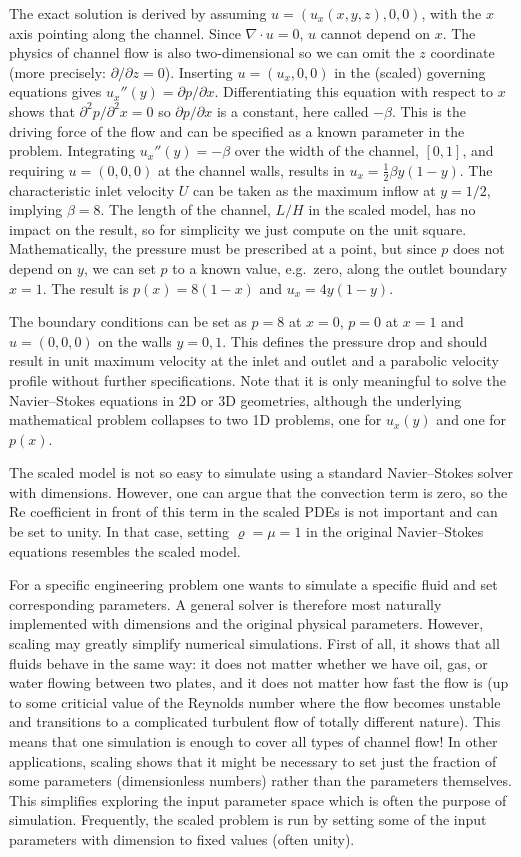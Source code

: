 \documentclass[graybox,envcountchap,sectrefs,final]{svmonodo}
\begin{document}
The exact solution is derived by assuming $u=(u_x(x,y,z),0,0)$, with
the $x$ axis pointing along the channel. Since $\nabla\cdot u=0$, $u$
cannot depend on $x$. The physics of channel flow is also
two-dimensional so we can omit the $z$ coordinate (more precisely:
$\partial/\partial z=0$). Inserting $u=(u_x,0,0)$ in the (scaled)
governing equations gives $u_x''(y) = \partial p/\partial x$.
Differentiating this equation with respect to $x$ shows that $\partial^2
p/\partial^2 x =0$ so $\partial
p/\partial x$ is a constant, here called $-\beta$. This is the driving
force of the flow and can be specified as a known parameter in the
problem.  Integrating $u_x''(y)=-\beta$ over the width of the channel,
$[0,1]$, and requiring $u=(0, 0, 0)$ at the channel walls, results in
$u_x=\frac{1}{2}\beta y(1-y)$. The characteristic inlet velocity
$U$ can be taken as the maximum inflow at $y=1/2$, implying
$\beta = 8$. The length of the channel, $L/H$ in the scaled
model, has no impact on the result, so for simplicity we just compute
on the unit square. Mathematically, the pressure must be prescribed
at a point, but since $p$ does not depend on $y$, we can set $p$ to a
known value, e.g.~zero, along the outlet boundary $x=1$. The result
is $p(x)=8(1-x)$ and $u_x=4y(1-y)$.

The boundary conditions can be set as $p=8$ at $x=0$, $p=0$ at $x=1$
and $u=(0, 0, 0)$ on the walls $y=0,1$. This defines the pressure drop
and should result in unit maximum velocity at the inlet and outlet and
a parabolic velocity profile without further specifications. Note that
it is only meaningful to solve the Navier--Stokes equations in 2D or
3D geometries, although the underlying mathematical problem collapses
to two 1D problems, one for $u_x(y)$ and one for $p(x)$.

The scaled model is not so easy to simulate using a standard
Navier--Stokes solver with dimensions. However, one can argue that the
convection term is zero, so the Re coefficient in front of this term
in the scaled PDEs is not important and can be set to unity. In that
case, setting $\varrho = \mu = 1$ in the original Navier--Stokes equations
resembles the scaled model.

For a specific engineering problem one wants to simulate a specific
fluid and set corresponding parameters. A general solver is therefore
most naturally implemented with dimensions and the original physical
parameters. However, scaling may greatly simplify numerical
simulations. First of all, it shows that all fluids behave in the
same way: it does not matter whether we have oil, gas, or water
flowing between two plates, and it does not matter how fast the flow
is (up to some criticial value of the Reynolds number where the flow
becomes unstable and transitions to a complicated turbulent flow of
totally different nature). This means that one simulation is enough
to cover all types of channel flow! In other applications, scaling
shows that it might be necessary to set just the fraction of some
parameters (dimensionless numbers) rather than the parameters
themselves. This simplifies exploring the input parameter space which
is often the purpose of simulation. Frequently, the scaled problem is
run by setting some of the input parameters with dimension to fixed
values (often unity).
\end{document}
